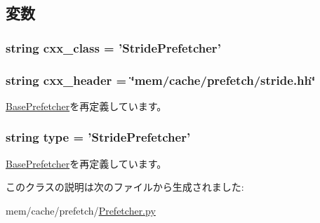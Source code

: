 \subsection{変数}
\hypertarget{classPrefetcher_1_1StridePrefetcher_a58cd55cd4023648e138237cfc0822ae3}{
\subsubsection[{cxx\_\-class}]{\setlength{\rightskip}{0pt plus 5cm}string cxx\_\-class = '{\bf StridePrefetcher}'}}
\label{classPrefetcher_1_1StridePrefetcher_a58cd55cd4023648e138237cfc0822ae3}
\hypertarget{classPrefetcher_1_1StridePrefetcher_a17da7064bc5c518791f0c891eff05fda}{
\subsubsection[{cxx\_\-header}]{\setlength{\rightskip}{0pt plus 5cm}string cxx\_\-header = \char`\"{}mem/cache/prefetch/stride.hh\char`\"{}}}
\label{classPrefetcher_1_1StridePrefetcher_a17da7064bc5c518791f0c891eff05fda}


\hyperlink{classPrefetcher_1_1BasePrefetcher_a17da7064bc5c518791f0c891eff05fda}{BasePrefetcher}を再定義しています。\hypertarget{classPrefetcher_1_1StridePrefetcher_acce15679d830831b0bbe8ebc2a60b2ca}{
\subsubsection[{type}]{\setlength{\rightskip}{0pt plus 5cm}string type = '{\bf StridePrefetcher}'}}
\label{classPrefetcher_1_1StridePrefetcher_acce15679d830831b0bbe8ebc2a60b2ca}


\hyperlink{classPrefetcher_1_1BasePrefetcher_acce15679d830831b0bbe8ebc2a60b2ca}{BasePrefetcher}を再定義しています。

このクラスの説明は次のファイルから生成されました:\begin{DoxyCompactItemize}
\item 
mem/cache/prefetch/\hyperlink{Prefetcher_8py}{Prefetcher.py}\end{DoxyCompactItemize}
